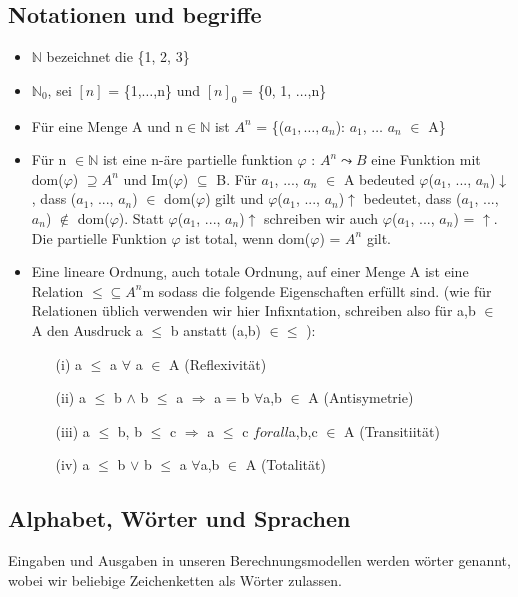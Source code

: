 \documentclass[a4paper,11pt]{article}
\begin{document}
\subsection{Notationen und begriffe}
\begin{itemize}
    \item $\mathbb{N}$ bezeichnet die \{1, 2, 3\}
    \item $\mathbb{N}_{0}$, sei $[n]$ = \{1,$\ldots $,n\} und $[n]_{0}$ = \{0, 1, $\ldots $,n\} 
    \item Für eine Menge A und n$\in \mathbb{N}$ ist $A^{n}$ = \{($a_{1},\ldots, a_{n}$): $a_{1}$, $\ldots$ $a_{n}$ $\in$ A\}
    \item Für n $\in \mathbb{N}$ ist eine n-äre partielle funktion $\varphi$ : $A^{n} \leadsto B $ eine Funktion mit dom($\varphi$) $\supseteq A^{n}$ und Im($\varphi$) $\subseteq$ B. 
    Für $a_{1}$, ..., $a_{n}$ $\in$ A bedeuted $\varphi$($a_{1}$, ..., $a_{n}$)$\downarrow$, dass ($a_{1}$, ..., $a_{n}$) $\in$ dom($\varphi$) gilt und $\varphi$($a_{1}$, ..., $a_{n}$)$\uparrow$ bedeutet, 
    dass ($a_{1}$, ..., $a_{n}$) $\notin$ dom($\varphi$). Statt $\varphi$($a_{1}$, ..., $a_{n}$)$\uparrow$ schreiben wir auch $\varphi$($a_{1}$, ..., $a_{n}$) = $\uparrow$.
    Die partielle Funktion $\varphi$ ist total, wenn dom($\varphi$) = $A^{n}$ gilt.
    \item Eine lineare Ordnung, auch totale Ordnung, auf einer Menge A ist eine Relation $\leq  \subseteq  A^{n}$m sodass die folgende Eigenschaften erfüllt sind. 
    (wie für Relationen üblich verwenden wir hier Infixntation, schreiben also für a,b $\in$ A den Ausdruck a $\leq $ b anstatt (a,b) $\in \leq $ ): 
    \begin{enumerate}
        \item[(i)] a $\leq $ a $\forall$ a $\in$ A (Reflexivität)
        \item[(ii)] a $\leq $ b $ \land $ b $\leq $ a $\Rightarrow $ a = b $\forall$a,b $\in$ A (Antisymetrie)
        \item[(iii)] a $\leq $ b, b $\leq $ c $\Rightarrow$ a $\leq $ c $forall$a,b,c $\in$ A (Transitiität)
        \item[(iv)] a $\leq $ b $\vee$ b $\leq $ a $\forall$a,b $\in$ A (Totalität)
    \end{enumerate} 
\end{itemize}

\subsection{Alphabet, Wörter und Sprachen}
Eingaben und Ausgaben in unseren Berechnungsmodellen werden wörter genannt, wobei wir beliebige Zeichenketten als Wörter zulassen.
\end{document}
